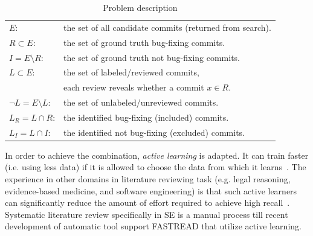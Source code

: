 \documentclass[10pt,conference]{IEEEtran}
\begin{document}
\begin{table}[!t]
\footnotesize
\caption{Problem description}
\vspace{-10pt}
\label{tab: problem}
\begin{tabular}{ll}
\rowcolor{gray!10} 
$E$: & the set of all candidate commits (returned from search).\\\rowcolor{gray!10} 
$R\subset E$: & the set of ground truth bug-fixing commits. \\\rowcolor{gray!10} 
$I=E\setminus R$: & the set of ground truth not bug-fixing commits.\\\rowcolor{gray!10} 
$L\subset E$: & the set of labeled/reviewed commits, \\\rowcolor{gray!10}  & each review reveals whether a commit $x\in R$.\\\rowcolor{gray!10} 
$\neg L=E\setminus L$: & the set of unlabeled/unreviewed commits.\\\rowcolor{gray!10} 
$L_R=L\cap R$: & the identified bug-fixing (included) commits.\\\rowcolor{gray!10} 
$L_I=L\cap I$: & the identified not bug-fixing (excluded) commits.
\end{tabular}
\vspace{-5mm}
\end{table}


In order to achieve the combination, {\em active learning} is adapted. It can train faster (i.e. using less  data) if it is allowed to choose the data from which it learns~\cite{settles2012active}. The experience in other domains in literature reviewing task (e.g. legal reasoning, evidence-based medicine, and software engineering) is that such active learners can significantly reduce the amount of effort required to achieve high recall~\cite{Cormack2017Navigating, Cormack2016Engineering, cormack2016scalability, Cormack2015Autonomy, Cormack2014Evaluation, Wallace2010Semi, wallace2010active, wallace2011should, wallace2012class, nguyen2015combining, Yu2018Recall}. Systematic literature review specifically in SE is a manual process till recent development of automatic tool support FASTREAD that utilize active learning. 

 
\end{document}
